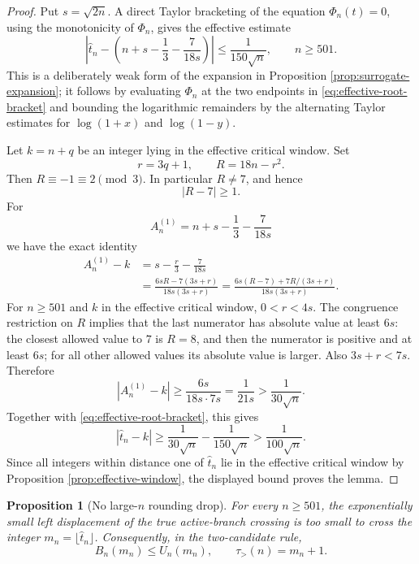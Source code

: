 \documentclass[11pt]{article}
\newtheorem{proposition}[theorem]{Proposition}
\theoremstyle{definition}
\begin{document}
\begin{proof}
Put \(s=\sqrt{2n}\).  A direct Taylor bracketing of the equation \(\Phi_n(t)=0\), using the monotonicity of \(\Phi_n\), gives the effective estimate
\begin{equation}\label{eq:effective-root-bracket}
  \left|\widehat t_n-
  \left(n+s-\frac13-\frac{7}{18s}\right)\right|
  \le \frac{1}{150\sqrt n},
  \qquad n\ge501.
\end{equation}
This is a deliberately weak form of the expansion in Proposition \ref{prop:surrogate-expansion}; it follows by evaluating \(\Phi_n\) at the two endpoints in \eqref{eq:effective-root-bracket} and bounding the logarithmic remainders by the alternating Taylor estimates for \(\log(1+x)\) and \(\log(1-y)\).

Let \(k=n+q\) be an integer lying in the effective critical window.  Set
\[
  r=3q+1,
  \qquad
  R=18n-r^2.
\]
Then \(R\equiv -1\equiv2\pmod 3\).  In particular \(R\ne7\), and hence
\[
  |R-7|\ge1.
\]
For
\[
  A_n^{(1)}=n+s-\frac13-\frac{7}{18s}
\]
we have the exact identity
\begin{align*}
  A_n^{(1)}-k
  &=s-\frac r3-\frac{7}{18s} \\
  &=\frac{6sR-7(3s+r)}{18s(3s+r)}
   =\frac{6s(R-7)+7R/(3s+r)}{18s(3s+r)}.
\end{align*}
For \(n\ge501\) and \(k\) in the effective critical window, \(0<r<4s\).  The congruence restriction on \(R\) implies that the last numerator has absolute value at least \(6s\): the closest allowed value to \(7\) is \(R=8\), and then the numerator is positive and at least \(6s\); for all other allowed values its absolute value is larger.  Also \(3s+r<7s\).  Therefore
\[
  |A_n^{(1)}-k|\ge \frac{6s}{18s\cdot 7s}=\frac{1}{21s}
  >\frac{1}{30\sqrt n}.
\]
Together with \eqref{eq:effective-root-bracket}, this gives
\[
  |\widehat t_n-k|
  \ge \frac{1}{30\sqrt n}-\frac{1}{150\sqrt n}
  >\frac{1}{100\sqrt n}.
\]
Since all integers within distance one of \(\widehat t_n\) lie in the effective critical window by Proposition \ref{prop:effective-window}, the displayed bound proves the lemma.
\end{proof}

\begin{proposition}[No large-\(n\) rounding drop]\label{prop:no-large-drop}
For every \(n\ge501\), the exponentially small left displacement of the true active-branch crossing is too small to cross the integer \(m_n=\lfloor\widehat t_n\rfloor\).  Consequently, in the two-candidate rule,
\[
  B_n(m_n)\le U_n(m_n),
  \qquad
  \tau_>(n)=m_n+1.
\]
\end{proposition}
\end{document}
